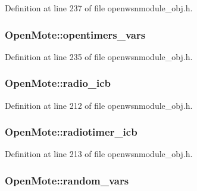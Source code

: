 Definition at line 237 of file openwsnmodule\+\_\+obj.\+h.

\subsubsection[{\texorpdfstring{opentimers\+\_\+vars}{opentimers_vars}}]{ Open\+Mote\+::opentimers\+\_\+vars}\hypertarget{struct_open_mote_ad90befaa4329ea1edce6ca5c2697e8b1}{}\label{struct_open_mote_ad90befaa4329ea1edce6ca5c2697e8b1}


Definition at line 235 of file openwsnmodule\+\_\+obj.\+h.

\subsubsection[{\texorpdfstring{radio\+\_\+icb}{radio_icb}}]{ Open\+Mote\+::radio\+\_\+icb}\hypertarget{struct_open_mote_ac0f941ac98e21115b10e0c1af009eb81}{}\label{struct_open_mote_ac0f941ac98e21115b10e0c1af009eb81}


Definition at line 212 of file openwsnmodule\+\_\+obj.\+h.

\subsubsection[{\texorpdfstring{radiotimer\+\_\+icb}{radiotimer_icb}}]{ Open\+Mote\+::radiotimer\+\_\+icb}\hypertarget{struct_open_mote_a5ceff4b6431ea734d207710a724693f6}{}\label{struct_open_mote_a5ceff4b6431ea734d207710a724693f6}


Definition at line 213 of file openwsnmodule\+\_\+obj.\+h.

\subsubsection[{\texorpdfstring{random\+\_\+vars}{random_vars}}]{ Open\+Mote\+::random\+\_\+vars}\hypertarget{struct_open_mote_ac39c7ed7d81f99bb3759327ecc34b020}{}\label{struct_open_mote_ac39c7ed7d81f99bb3759327ecc34b020}


